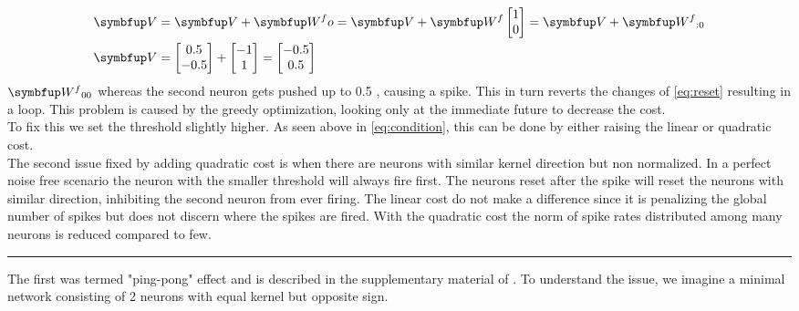 \begin{equation}\label{eq:reset}
\begin{aligned}
\bmu{V} &= \bmu{V} + \bmu{W^fo} = \bmu{V} + \bmu{W^f}\begin{bmatrix}
1\\
0
\end{bmatrix} = \bmu{V} + \bmu{W^f}_{:0}\\
\bmu{V} &= \begin{bmatrix}
0.5\\
-0.5\\
\end{bmatrix} +
\begin{bmatrix}
-1\\
1\\
\end{bmatrix} =
\begin{bmatrix}
-0.5\\
0.5
\end{bmatrix}
\end{aligned}
\end{equation}
$\bmu{W^f}_{00}$ whereas the second neuron gets pushed up to 0.5 , causing a spike. This in turn reverts the changes of \cref{eq:reset} resulting in a loop. This problem is caused by the greedy optimization, looking only at the immediate future to decrease the cost.\\
To fix this we set the threshold slightly higher. As seen above in \cref{eq:condition}, this can be done by either raising the linear or quadratic cost.\\
The second issue fixed by adding quadratic cost is when there are
neurons with similar kernel direction but non normalized. In a perfect noise free scenario the neuron with the smaller threshold will always fire first. The neurons reset after the spike will reset the neurons with similar direction, inhibiting the second neuron from ever firing. The linear cost do not make a difference since it is penalizing the global number of spikes but does not discern where the spikes are fired. With the quadratic cost the norm of spike rates distributed among many neurons is reduced compared to few.

\vspace{2cm}
\hrule
The first was termed "ping-pong" effect and is described in the supplementary material of \cite{boerlin_predictive_2013}. To understand the issue, we imagine a minimal network consisting of 2 neurons with equal kernel but opposite sign. \\


